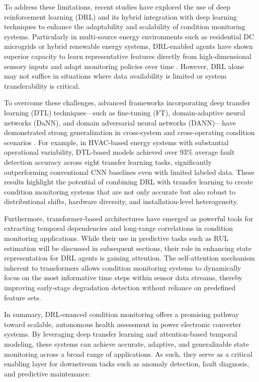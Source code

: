 To address these limitations, recent studies have explored the use of deep reinforcement learning (DRL) and its hybrid integration with deep learning techniques to enhance the adaptability and scalability of condition monitoring systems. Particularly in multi-source energy environments such as residential DC microgrids or hybrid renewable energy systems, DRL-enabled agents have shown superior capacity to learn representative features directly from high-dimensional sensory inputs and adapt monitoring policies over time \cite{xu2024comparative}. However, DRL alone may not suffice in situations where data availability is limited or system transferability is critical.

To overcome these challenges, advanced frameworks incorporating deep transfer learning (DTL) techniques—such as fine-tuning (FT), domain-adaptive neural networks (DaNN), and domain adversarial neural networks (DANN)—have demonstrated strong generalization in cross-system and cross-operating condition scenarios \cite{saleem2024transrul}. For example, in HVAC-based energy systems with substantial operational variability, DTL-based models achieved over 93\% average fault detection accuracy across eight transfer learning tasks, significantly outperforming conventional CNN baselines even with limited labeled data. These results highlight the potential of combining DRL with transfer learning to create condition monitoring systems that are not only accurate but also robust to distributional shifts, hardware diversity, and installation-level heterogeneity.

Furthermore, transformer-based architectures have emerged as powerful tools for extracting temporal dependencies and long-range correlations in condition monitoring applications. While their use in predictive tasks such as RUL estimation will be discussed in subsequent sections, their role in enhancing state representation for DRL agents is gaining attention. The self-attention mechanism inherent to transformers allows condition monitoring systems to dynamically focus on the most informative time steps within sensor data streams, thereby improving early-stage degradation detection without reliance on predefined feature sets. 

In summary, DRL-enanced condition monitoring offers a promising pathway toward scalable, autonomous health assessment in power electronic converter systems. By leveraging deep transfer learning and attention-based temporal modeling, these systems can achieve accurate, adaptive, and generalizable state monitoring across a broad range of applications. As such, they serve as a critical enabling layer for downstream tasks such as anomaly detection, fault diagnosis, and predictive maintenance.

